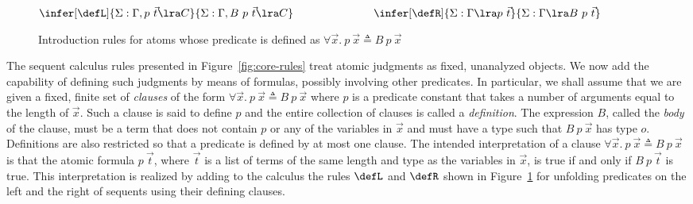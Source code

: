 \begin{figure}[t]
\begin{center}
$\infer[\defL]
      {\Sigma : \Gamma, p\ \vec{t} \lra C}
      {\Sigma : \Gamma, B\ p\ \vec{t} \lra C}
\hspace{1in}
\infer[\defR]
      {\Sigma : \Gamma \lra p\ \vec{t}}
      {\Sigma : \Gamma \lra B\ p\ \vec{t}}
$
\end{center}
\caption{Introduction rules for atoms whose predicate is defined as $\forall
  \vec{x}.~p\ \vec{x} \triangleq B\ p\ \vec{x}$}
\label{fig:defrules}
\end{figure}


The sequent calculus rules presented in Figure~\ref{fig:core-rules}
treat atomic judgments as fixed, unanalyzed objects.
We now add the capability of defining such judgments by means of
formulas, possibly involving other predicates. In particular, we shall
assume that we are given a
fixed, finite set of \emph{clauses} of the
form $\forall \vec{x}.~p\ \vec{x} \triangleq B\ p\ \vec{x}$ where $p$
is a predicate constant that takes a number of arguments equal to the
length of $\vec{x}$. Such a clause is said to define $p$ and the
entire collection of clauses is called a {\em
  definition}. The expression $B$, called the {\em body} of the
clause, must be a term that does not contain $p$ or
any of the variables in $\vec{x}$ and must have a type such that
$B\ p\ \vec{x}$ has type $o$.  Definitions are also restricted so that
a predicate is defined by at most one clause.
The intended interpretation of a clause $\forall \vec{x}.~p\ \vec{x}
\triangleq B\ p\ \vec{x}$ is that the atomic
formula $p\ \vec{t}$, where $\vec{t}$ is a list of terms of the same
length and type as the variables in $\vec{x}$, is true if and only if
$B\ p\ \vec{t}$ is true.
This interpretation is realized by adding to the calculus the rules
$\defL$ and $\defR$ shown in Figure~\ref{fig:defrules} for unfolding
predicates on the left and the right of sequents using their defining
clauses.

